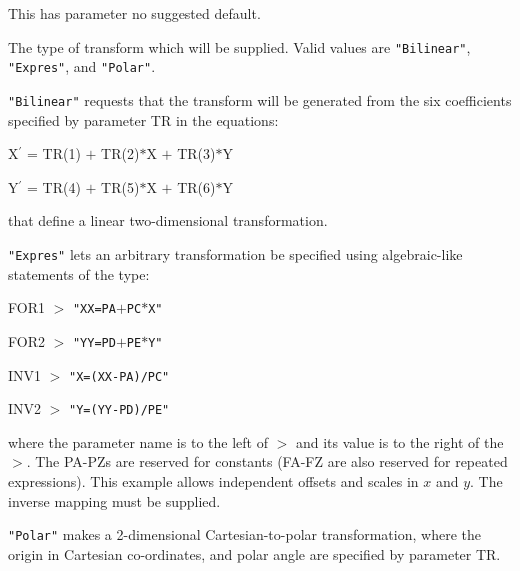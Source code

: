 \documentclass[twoside,11pt]{article}
\newcommand{\sstsubsection}[1]{ \item[{#1}] \mbox{} \\}
\renewcommand{\sstsubsection}[1]{\item[{#1}]}
\begin{document}
{{{         This has parameter no suggested default.
      }
      \sstsubsection{
         TRTYPE = LITERAL (Read)
      }{
         The type of transform which will be supplied.  Valid values are
         {\tt "Bilinear"}, {\tt "Expres"}, and {\tt "Polar"}.

         {\tt "Bilinear"} requests that the transform will be generated from
         the six coefficients specified by parameter TR in the
         equations:
         \begin{description}
         \item X$^\prime$ = TR(1) $+$ TR(2)$*$X $+$ TR(3)$*$Y
         \item Y$^\prime$ = TR(4) $+$ TR(5)$*$X $+$ TR(6)$*$Y
         \end{description}
         that define a linear two-dimensional transformation.

         {\tt "Expres"} lets an arbitrary transformation be specified
         using algebraic-like statements of the type:
         \begin{description}
         \item  FOR1 $>$ {\tt "XX=PA$+$PC$*$X"}
         \item  FOR2 $>$ {\tt "YY=PD$+$PE$*$Y"}
         \item  INV1 $>$ {\tt "X=(XX-PA)/PC"}
         \item  INV2 $>$ {\tt "Y=(YY-PD)/PE"}
         \end{description}
         where the parameter name is to the left of $>$ and its value is
         to the right of the $>$.  The PA-PZs are reserved for constants
         (FA-FZ are also reserved for repeated expressions).  This
         example allows independent offsets and scales in $x$ and $y$.  The
         inverse mapping must be supplied.

         {\tt "Polar"} makes a 2-dimensional Cartesian-to-polar
         transformation, where the origin in Cartesian co-ordinates, and
         polar angle are specified by parameter TR.

}}}
\end{document}
